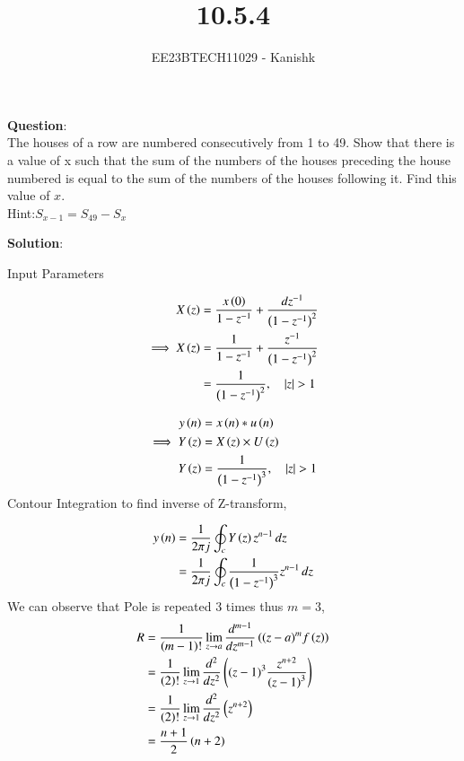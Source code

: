 \documentclass[journal,12pt,twocolumn]{IEEEtran}
\theoremstyle{remark}
\begin{document}

\vspace{3cm}

\title{10.5.4}
\author{EE23BTECH11029 - Kanishk}
\maketitle
\newpage

\bigskip

\renewcommand{\thefigure}{\theenumi}
\renewcommand{\thetable}{\theenumi}
\textbf{Question}:\\
The houses of a row are numbered consecutively from 1 to 49. Show that there is a value
of x such that the sum of the numbers of the houses preceding the house numbered is equal to the sum of the numbers of the houses following it. Find this value of $x$.\\
Hint:$ S_{x-1}=S_{49}-S_x$

\textbf{Solution}:\\

\begin{table}[ht]
    \centering
    \def\arraystretch{2}
    
   \caption{Input Parameters}
   \label{tab:10.5.4}
\end{table}

\begin{align}
X\left(z\right)&=\frac{x\left(0\right)}{1-z^{-1}}+ \frac{dz^{-1}}{\left(1-z^{-1}\right)^{2}}\\
\implies X\left(z\right)&=\frac{1}{1-z^{-1}}+ \frac{z^{-1}}{\left(1-z^{-1}\right)^{2}}\\
&=\frac{1}{\left(1-z^{-1}\right)^{2}},\quad \left\vert z\right\vert > 1
\end{align}

\begin{align}
y\left(n\right)&=x\left(n\right)*u\left(n\right)\\
\implies Y\left(z\right)&=X\left(z\right)\times U\left(z\right)\\
Y\left(z\right)&= \frac{1}{\left(1-z^{-1}\right)^{3}},\quad \left\vert z\right\vert>1
\end{align}
Contour Integration to find inverse of Z-transform,

\begin{align}
y\left(n\right)&=\frac{1}{2\pi j}\oint_c Y\left(z\right)z^{n-1} \,dz\\
&=\frac{1}{2\pi j} \oint_c \frac{1}{\left(1-z^{-1}\right)^{3}}z^{n-1} \,dz
\end{align}
We can observe that Pole is repeated 3 times thus $m=3$,
\begin{align}
R&=\frac{1}{\left(m-1\right)!}\lim\limits_{z\to a}\frac{d^{m-1}}{dz^{m-1}}\left({(z-a)}^{m}f\left(z\right)\right)  \\
&=\frac{1}{\left(2\right)!}\lim\limits_{z\to 1}\frac{d^{2}}{dz^{2}}\left({(z-1)}^{3}\frac{z^{n+2}}{{(z-1)}^3}\right)\\
&=\frac{1}{\left(2\right)!}\lim\limits_{z\to 1}\frac{d^{2}}{dz^{2}}\left(z^{n+2}\right)\\
&=\frac{n+1}{2}\left(n+2\right)
\end{align}
\end{document}
